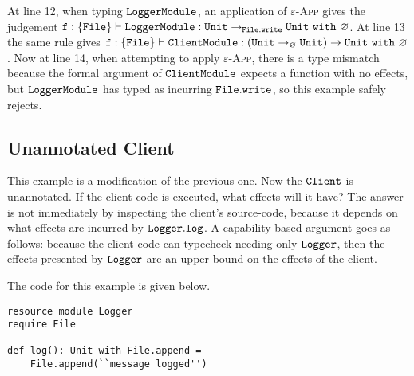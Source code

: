 At line 12, when typing $\mathtt{LoggerModule}$, an application of \textsc{$\varepsilon$-App} gives the judgement $\mathtt{ f: \{ File \} \vdash LoggerModule: Unit \rightarrow_{\mathtt{File.write}} Unit~\mathtt{with}~ \varnothing}$. At line 13 the same rule gives $\mathtt{ f: \{ File \} \vdash ClientModule: (Unit \rightarrow_{\varnothing} Unit) \rightarrow Unit~\mathtt{with}~ \varnothing}$. Now at line 14, when attempting to apply \textsc{$\varepsilon$-App}, there is a type mismatch because the formal argument of $\mathtt{ClientModule}$ expects a function with no effects, but $\mathtt{LoggerModule}$ has typed as incurring $\mathtt{File.write}$, so this example safely rejects.









































\subsection{Unannotated Client}

This example is a modification of the previous one. Now the $\mathtt{Client}$ is unannotated. If the client code is executed, what effects will it have? The answer is not immediately by inspecting the client's source-code, because it depends on what effects are incurred by $\mathtt{Logger.log}$. A capability-based argument goes as follows: because the client code can typecheck needing only $\mathtt{Logger}$, then the effects presented by $\mathtt{Logger}$ are an upper-bound on the effects of the client.

The code for this example is given below.

\begin{lstlisting}
resource module Logger
require File

def log(): Unit with File.append =
    File.append(``message logged'')
\end{lstlisting}

